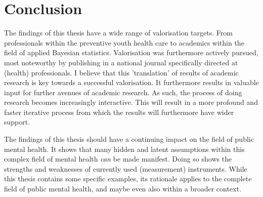 \section*{Conclusion}
The findings of this thesis have a wide range of valorisation targets. 
From professionals within the preventive youth health care to academics within the field of applied Bayesian statistics. 
Valorisation was furthermore actively pursued, most noteworthy by publishing in a national journal specifically directed at (health) professionals. 
I believe that this 'translation' of results of academic research is key towards a successful valorisation. 
It furthermore results in valuable input for further avenues of academic research. 
As such, the process of doing research becomes increasingly interactive. 
This will result in a more profound and faster iterative process from which the results will furthermore have wider support.

The findings of this thesis should have a continuing impact on the field of public mental health. 
It shows that many hidden and latent assumptions within this complex field of mental health \textit{can} be made manifest. 
Doing so shows the strengths and weaknesses of currently used (measurement) instruments. 
While this thesis contains some specific examples, its rationale applies to the complete field of public mental health, and maybe even also within a broader context.